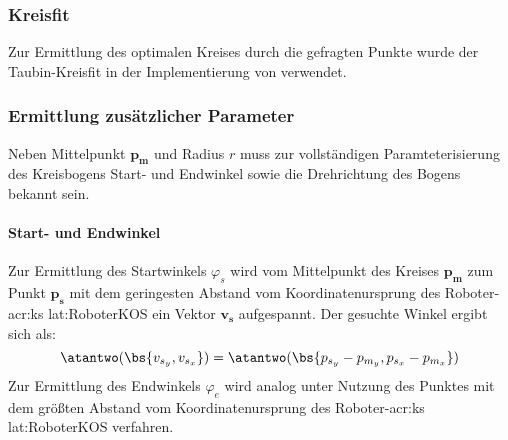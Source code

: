 \subsubsection{Kreisfit} 
Zur Ermittlung des optimalen Kreises durch die gefragten Punkte wurde der Taubin-Kreisfit \autocite{taubinEstimationPlanarCurves1991} in der Implementierung von \autocite{nikolaichernovMATLABCodesFitting} verwendet. 
\subsubsection{Ermittlung zusätzlicher Parameter}
Neben Mittelpunkt \(\boldsymbol{p_m}\) und Radius \(r\) muss zur vollständigen Paramteterisierung des Kreisbogens Start- und Endwinkel sowie die Drehrichtung des Bogens bekannt sein.

\paragraph{Start- und Endwinkel}
Zur Ermittlung des Startwinkels \( \varphi_s \) wird vom Mittelpunkt des Kreises \(\boldsymbol{p_m}\) zum Punkt  \(\boldsymbol{p_s}\) mit dem geringesten Abstand vom Koordinatenursprung des Roboter-\gls{acr:ks} \gls{lat:RoboterKOS} ein Vektor \(\boldsymbol{v_s}\) aufgespannt. Der gesuchte Winkel ergibt sich als:
\begin{equation}
\atantwo (\bs{v_{s_y}, v_{s_x}}) = 
\atantwo (\bs{p_{s_y}-p_{m_y}, p_{s_x}-p_{m_x}})
\end{equation}
Zur Ermittlung des Endwinkels \( \varphi_e \) wird analog unter Nutzung des Punktes mit dem größten Abstand vom Koordinatenursprung des Roboter-\gls{acr:ks} \gls{lat:RoboterKOS} verfahren.

